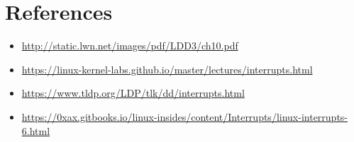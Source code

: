 \section{References}

\begin{frame}{\secname}
    \begin{itemize}
        \item \url{http://static.lwn.net/images/pdf/LDD3/ch10.pdf}
        \item \url{https://linux-kernel-labs.github.io/master/lectures/interrupts.html}
        \item \url{https://www.tldp.org/LDP/tlk/dd/interrupts.html}
        \item \url{https://0xax.gitbooks.io/linux-insides/content/Interrupts/linux-interrupts-6.html}
    \end{itemize}
\end{frame}
